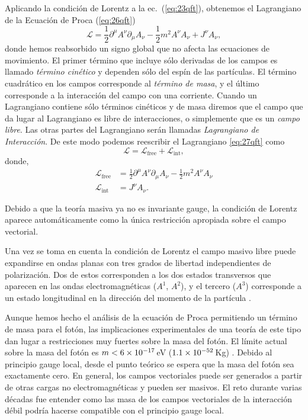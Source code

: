 Aplicando la condición de Lorentz a la ec.~(\ref{eq:23qft}), obtenemos el
Lagrangiano de la Ecuación de Proca (\ref{eq:26qft})
\begin{equation}
  \label{eq:27qft}
  \mathcal{L}=\frac{1}{2}\partial^\mu A^\nu\partial_\mu A_\nu-\frac{1}{2} m^2A^\nu A_\nu+J^\nu A_\nu,
\end{equation}
donde hemos reabsorbido un signo global que no afecta las ecuaciones
de movimiento. El primer término que incluye sólo derivadas de los
campos es llamado \emph{término cinético} y dependen sólo del espín de
las partículas. El término cuadrático en
los campos corresponde al \emph{término de masa}, y el último
corresponde a la interacción del campo con una corriente. Cuando un
Lagrangiano contiene sólo términos cinéticos y de masa diremos que el
campo que da lugar al Lagrangiano es libre de interacciones, o
simplemente que es un \emph{campo libre}. Las otras partes del
Lagrangiano serán llamadas \emph{Lagrangiano de Interacción}. De este
modo podemos reescribir el Lagrangiano \eqref{eq:27qft} como
\begin{equation*}
\mathcal{L}=\mathcal{L}_{\text{free}}+\mathcal{L}_{\text{int}},  
\end{equation*}
donde,
\begin{align}
\mathcal{L}_{\text{free}}&=\frac{1}{2}\partial^\mu A^\nu\partial_\mu A_\nu-\frac{1}{2} m^2A^\nu A_\nu\nonumber\\
\label{eq:28qft}
\mathcal{L}_{\text{int}}&=J^\nu A_\nu.
\end{align}

Debido a que la teoría masiva ya no es invariante gauge, la condición
de Lorentz aparece automáticamente como la única restricción apropiada
sobre el campo vectorial.

Una vez se toma en cuenta la condición de Lorentz el campo masivo
libre puede expandirse en ondas planas con tres grados de libertad
independientes de polarización. Dos de estos corresponden a los dos
estados transversos que aparecen en las ondas electromagnéticas
($A^1$, $A^2$), y el tercero ($A^3$) corresponde a un estado
longitudinal en la dirección del momento de la partícula \cite{Gross}.

Aunque hemos hecho el análisis de la ecuación de Proca permitiendo un
término de masa para el fotón, las implicaciones experimentales de una
teoría de este tipo dan lugar a restricciones muy fuertes sobre la
masa del fotón\cite{Goldhaber:1971mr}. El límite actual sobre la masa
del fotón es $m< 6\times 10^{-17}\,$eV ($1.1\times 10^{-52}\,$Kg)
\cite{Yao:2006px}. Debido al principio gauge local, desde el punto
teórico se espera que la masa del fotón sea exactamente cero. En
general, los campos vectoriales puede ser generados a partir de otras
cargas no electromagnéticas y pueden ser masivos. El reto durante
varias décadas fue entender como las masa de los campos vectoriales de
la interacción débil podría hacerse compatible con el principio gauge
local.  


